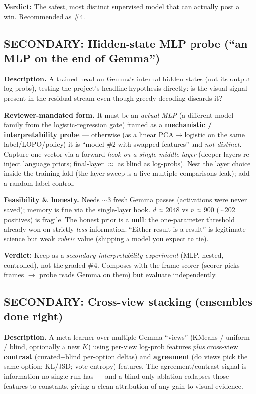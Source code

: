 \documentclass[11pt]{article}
\newcommand{\verdict}[2]{\par\smallskip\noindent\textbf{\color{#1}Verdict:} #2\par}
\newcommand{\secmark}{\textbf{\color{hsblue}SECONDARY}}
\begin{document}
\verdict{hsgreen}{The safest, most distinct supervised model that can actually post a win. Recommended as \#4.}

\subsection{\secmark: Hidden-state MLP probe (``an MLP on the end of Gemma'')}
\textbf{Description.} A trained head on Gemma's internal hidden states (not its output log-probs), testing the project's headline hypothesis directly: is the visual signal present in the residual stream even though greedy decoding discards it?

\textbf{Reviewer-mandated form.} It must be an \emph{actual MLP} (a different model family from the logistic-regression gate) framed as a \textbf{mechanistic / interpretability probe} --- otherwise (as a linear PCA$\to$logistic on the same label/LOPO/policy) it is ``model \#2 with swapped features'' and \emph{not distinct}. Capture one vector via a forward \emph{hook on a single middle layer} (deeper layers re-inject language priors; final-layer $\approx$ as blind as log-probs). Nest the layer choice inside the training fold (the layer sweep is a live multiple-comparisons leak); add a random-label control.

\textbf{Feasibility \& honesty.} Needs $\sim$3 fresh Gemma passes (activations were never saved); memory is fine via the single-layer hook. $d\approx2048$ vs $n\approx900$ ($\sim$202 positives) is fragile. The honest prior is a \textbf{null}: the one-parameter threshold already won on strictly \emph{less} information. ``Either result is a result'' is legitimate science but weak \emph{rubric} value (shipping a model you expect to tie).

\verdict{hsblue}{Keep as a \emph{secondary interpretability experiment} (MLP, nested, controlled), not the graded \#4. Composes with the frame scorer (scorer picks frames $\to$ probe reads Gemma on them) but evaluate independently.}

\subsection{\secmark: Cross-view stacking (ensembles done right)}
\textbf{Description.} A meta-learner over multiple Gemma ``views'' (KMeans / uniform / blind, optionally a new $K$) using per-view log-prob features \emph{plus} cross-view \textbf{contrast} (curated$-$blind per-option deltas) and \textbf{agreement} (do views pick the same option; KL/JSD; vote entropy) features. The agreement/contrast signal is information no single run has --- and a blind-only ablation collapses those features to constants, giving a clean attribution of any gain to visual evidence.
\end{document}

